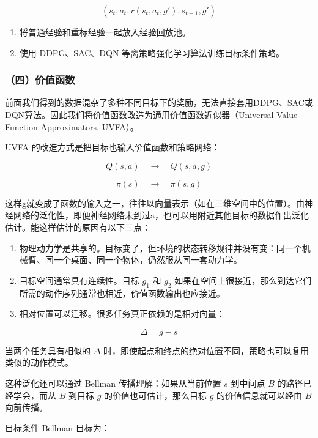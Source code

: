 \[
(s_t,a_t,r(s_t,a_t,g'),s_{t+1},g')
\]

\begin{enumerate}
\def\labelenumi{\arabic{enumi}.}
\setcounter{enumi}{3}
\tightlist
\item
  将普通经验和重标经验一起放入经验回放池。
\item
  使用 DDPG、SAC、DQN 等离策略强化学习算法训练目标条件策略。
\end{enumerate}

\hypertarget{ux56dbux4ef7ux503cux51fdux6570}{%
\subsubsection{（四）价值函数}\label{ux56dbux4ef7ux503cux51fdux6570}}

前面我们得到的数据混杂了多种不同目标下的奖励，无法直接套用DDPG、SAC或DQN算法。因此我们将价值函数改造为通用价值函数近似器（Universal Value Function Approximators, UVFA）。

UVFA 的改造方式是把目标也输入价值函数和策略网络：

\[
Q(s,a)\quad\longrightarrow\quad Q(s,a,g)
\]

\[
\pi(s)\quad\longrightarrow\quad \pi(s,g)
\]

这样g就变成了函数的输入之一，往往以向量表示（如在三维空间中的位置）。由神经网络的泛化性，即便神经网络未到过a，也可以用附近其他目标的数据作出泛化估计。能这样估计的原因有以下三点：

\begin{enumerate}
\def\labelenumi{\arabic{enumi}.}
\tightlist
\item
  物理动力学是共享的。目标变了，但环境的状态转移规律并没有变：同一个机械臂、同一个桌面、同一个物体，仍然服从同一套动力学。
\item
  目标空间通常具有连续性。目标 \(g_1\) 和 \(g_2\) 如果在空间上很接近，那么到达它们所需的动作序列通常也相近，价值函数输出也应接近。
\item
  相对位置可以迁移。很多任务真正依赖的是相对向量：
\end{enumerate}

\[
\Delta=g-s
\]

当两个任务具有相似的 \(\Delta\) 时，即使起点和终点的绝对位置不同，策略也可以复用类似的动作模式。

这种泛化还可以通过 Bellman 传播理解：如果从当前位置 \(s\) 到中间点 \(B\) 的路径已经学会，而从 \(B\) 到目标 \(g\) 的价值也可估计，那么目标 \(g\) 的价值信息就可以经由 \(B\) 向前传播。

目标条件 Bellman 目标为：

